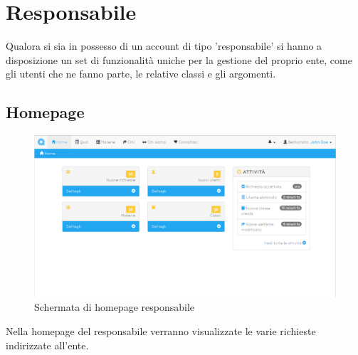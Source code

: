 \documentclass[a4paper, titlepage]{article}
\begin{document}
	 \newpage
	 \section{Responsabile}
	 Qualora si sia in possesso di un account di tipo 'responsabile' si hanno a disposizione un set di funzionalità uniche per la gestione del proprio ente, come gli utenti che ne fanno parte, le relative classi e gli argomenti.
	 
	 \subsection{Homepage}
	 \begin{figure}[!h]
	 	\centering
	 	\includegraphics[scale=0.33]{Img/screen_HomepageResponsabile.png}
	 	\caption{Schermata di homepage responsabile}
	 \end{figure}
	 Nella homepage del responsabile verranno visualizzate le varie richieste indirizzate all'ente.
	 
\end{document}
